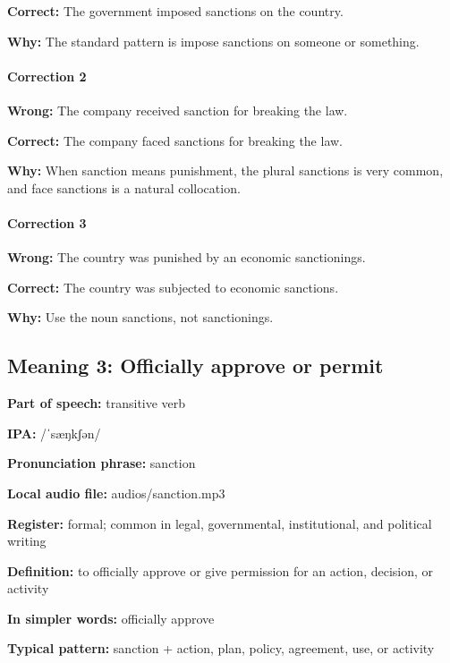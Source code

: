 \documentclass[11pt]{article}
\begin{document}
\textbf{Correct:} The government imposed sanctions on the country.

\textbf{Why:} The standard pattern is impose sanctions on someone or something.

\paragraph{Correction 2}
\textbf{Wrong:} The company received sanction for breaking the law.

\textbf{Correct:} The company faced sanctions for breaking the law.

\textbf{Why:} When sanction means punishment, the plural sanctions is very common, and face sanctions is a natural collocation.

\paragraph{Correction 3}
\textbf{Wrong:} The country was punished by an economic sanctionings.

\textbf{Correct:} The country was subjected to economic sanctions.

\textbf{Why:} Use the noun sanctions, not sanctionings.

\subsection{Meaning 3: Officially approve or permit}
\textbf{Part of speech:} transitive verb

\textbf{IPA:} /ˈsæŋkʃən/

\textbf{Pronunciation phrase:} sanction

\textbf{Local audio file:} audios/sanction.mp3

\textbf{Register:} formal; common in legal, governmental, institutional, and political writing

\textbf{Definition:} to officially approve or give permission for an action, decision, or activity

\textbf{In simpler words:} officially approve

\textbf{Typical pattern:} sanction + action, plan, policy, agreement, use, or activity
\end{document}

